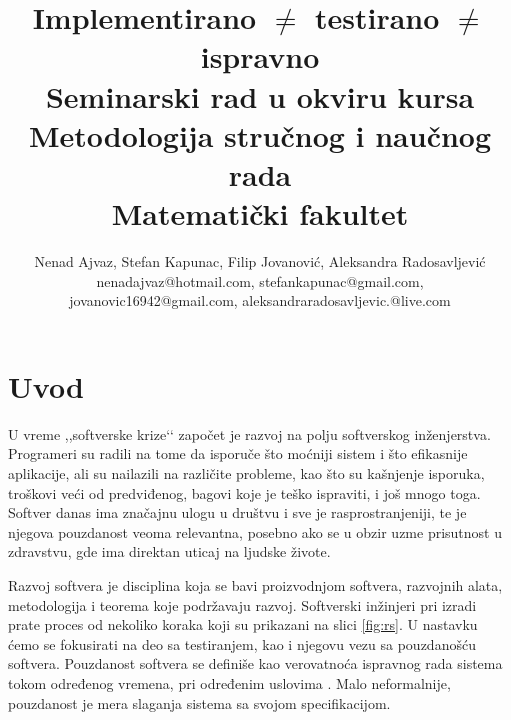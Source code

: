 \documentclass[a4paper]{article}
\begin{document}
\title{Implementirano $\neq$ testirano $\neq$ ispravno\\ \small{Seminarski rad u okviru kursa\\Metodologija stručnog i naučnog rada\\ Matematički fakultet}}

\author{Nenad Ajvaz, Stefan Kapunac, Filip Jovanović, Aleksandra Radosavljević\\ nenadajvaz@hotmail.com, stefankapunac@gmail.com, \\jovanovic16942@gmail.com, aleksandraradosavljevic.@live.com}


\maketitle


\tableofcontents

\newpage

\section{Uvod}
\label{sec:uvod}

U vreme ,,softverske krize‘‘ započet je razvoj na polju softverskog inženjerstva.
Programeri su radili na tome da isporuče što moćniji sistem i što efikasnije aplikacije, ali su nailazili na različite probleme, kao što su kašnjenje isporuka, troškovi veći od predviđenog, bagovi koje je teško ispraviti, i još mnogo toga.
Softver danas ima značajnu ulogu u društvu i sve je rasprostranjeniji, te je njegova pouzdanost veoma relevantna, posebno ako se u obzir uzme prisutnost u zdravstvu, gde ima direktan uticaj na ljudske živote.

Razvoj softvera je disciplina koja se bavi proizvodnjom softvera, razvojnih alata, metodologija i teorema koje podržavaju razvoj.
Softverski inžinjeri pri izradi prate proces od nekoliko koraka koji su prikazani na slici \ref{fig:rs}.
U nastavku ćemo se fokusirati na deo sa testiranjem, kao i njegovu vezu sa pouzdanošću softvera.
Pouzdanost softvera se definiše kao verovatnoća ispravnog rada sistema tokom određenog vremena, pri određenim uslovima \cite{pham_reliability}.
Malo neformalnije, pouzdanost je mera slaganja sistema sa svojom specifikacijom.
\end{document}

